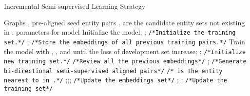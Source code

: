 \documentclass[sigconf]{acmart}
\begin{document}
\renewcommand{\algorithmicrequire}{\textbf{Input:}}
\renewcommand{\algorithmicensure}{\textbf{Output:}}
\begin{algorithm}[t]
    \footnotesize
    \caption{Incremental Semi-supervised Learning Strategy}
    \begin{algorithmic}[1]
        \Require Graphs , pre-aligned seed entity pairs .  are the candidate entity sets not existing in .
        \Ensure parameters  for model
        \State Initialize the model;
        \State ; \texttt{/*Initialize the training set.*/}
        \State ; \texttt{/*Store the embeddings of all previous training pairs.*/}
        \Repeat
            \State Train the model with , , and  until the loss of development set increase;
            \State ; \texttt{/*Initialize new training set.*/}
            \vspace{0.5em}
            \State \texttt{/*Review all the previous embeddings*/}
            \For {}
                \If {}
                    \State ;
                \EndIf
            \EndFor
            \State \texttt{/*Generate bi-directional semi-supervised aligned pairs*/}
            \For {}
                \State  \texttt{/* is the entity nearest to  in .*/}
                \If {}
                    \State ;\;\;\;;\;\;\;;
                \EndIf
            \EndFor
            \vspace{0.5em}
            \State \texttt{/*Update the embeddings set*/}
            \For {}
                    \state ;
            \EndFor
            \State ; \texttt{/*Update the training set*/}
    \end{algorithmic}\label{algorithm}
    \vspace{-0.5em}
\end{algorithm}
\end{document}
